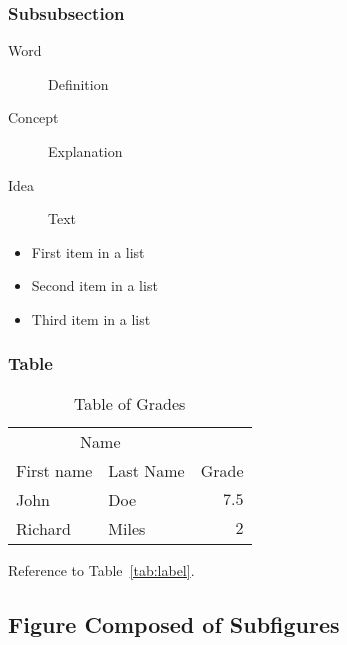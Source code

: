 \documentclass[
12pt, %
a4paper, %
oneside, %
headinclude,footinclude, %
BCOR5mm, %
german]{scrartcl}
\begin{document}
\lipsum[11] %

\subsubsection{Subsubsection}

\lipsum[12] %

\begin{description}
\item[Word] Definition
\item[Concept] Explanation
\item[Idea] Text
\end{description}

\lipsum[12] %

\begin{itemize}[noitemsep] %
\item First item in a list
\item Second item in a list
\item Third item in a list
\end{itemize}

\subsubsection{Table}

\lipsum[13] %

\begin{table}[hbt]
\caption{Table of Grades}
\centering
\begin{tabular}{llr}
\toprule
\multicolumn{2}{c}{Name} \\
\cmidrule(r){1-2}
First name & Last Name & Grade \\
\midrule
John & Doe & $7.5$ \\
Richard & Miles & $2$ \\
\bottomrule
\end{tabular}
\label{tab:label}
\end{table}

Reference to Table~\vref{tab:label}. %


\subsection{Figure Composed of Subfigures}
\end{document}

